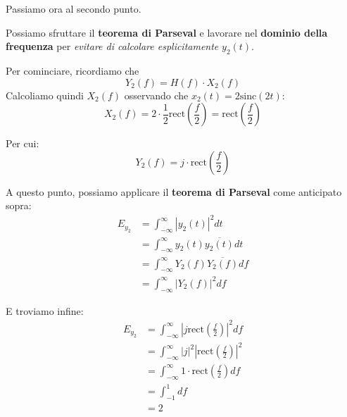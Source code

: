 Passiamo ora al secondo punto. 

\begin{remark}
    Possiamo sfruttare il \textbf{teorema di Parseval} e
    lavorare nel \textbf{dominio della frequenza} per
    \textit{evitare di calcolare esplicitamente} $y_{2}(t)$.
\end{remark}

Per cominciare, ricordiamo che
\[
    Y_{2}(f) = H(f) \cdot X_{2}(f)
\]
Calcoliamo quindi $X_{2}(f)$ osservando che $x_{2}(t) = 2 \text{sinc}(2t)$:
\[
    X_{2}(f) = 2 \cdot \frac{1}{2}\text{rect} \left( \frac{f}{2} \right) 
    = \text{rect} \left( \frac{f}{2} \right)
\]

Per cui:
\[
    Y_{2}(f) = j \cdot \text{rect} \left( \frac{f}{2} \right)
\]

A questo punto, possiamo applicare il \textbf{teorema di Parseval}
come anticipato sopra:
\[
    \begin{aligned}
        E_{y_{2}} &= \int_{-\infty}^{\infty} |y_{2}(t)|^2 dt \\
                  &= \int_{-\infty}^{\infty} y_{2}(t) \overline{y_{2}(t)} dt \\ 
                  &= \int_{-\infty}^{\infty} Y_{2}(f) \overline{Y_{2}(f)} df \\ 
                  &= \int_{-\infty}^{\infty} |Y_{2}(f)|^2 df
    \end{aligned}
\]

E troviamo infine:
\[
    \begin{aligned}
        E_{y_{2}} &= \int_{-\infty}^{\infty} |j \text{rect} \left( \frac{f}{2} \right) |^2 df \\ 
                  &= \int_{-\infty}^{\infty} |j|^2 \left| \text{rect} \left( \frac{f}{2} \right) \right|^2 \\ 
                  &= \int_{-\infty}^{\infty} 1 \cdot \text{rect} \left( \frac{f}{2} \right) df \\
                  &= \int_{-1}^{1} df \\ 
                  &= 2
    \end{aligned}
\]

